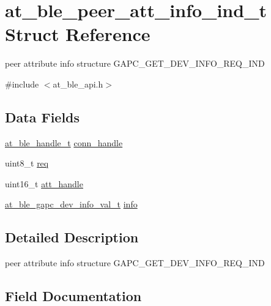 \hypertarget{structat__ble__peer__att__info__ind__t}{}\section{at\+\_\+ble\+\_\+peer\+\_\+att\+\_\+info\+\_\+ind\+\_\+t Struct Reference}
\label{structat__ble__peer__att__info__ind__t}


peer attribute info structure G\+A\+P\+C\+\_\+\+G\+E\+T\+\_\+\+D\+E\+V\+\_\+\+I\+N\+F\+O\+\_\+\+R\+E\+Q\+\_\+\+I\+ND  




{\ttfamily \#include $<$at\+\_\+ble\+\_\+api.\+h$>$}

\subsection*{Data Fields}
\begin{DoxyCompactItemize}
\item 
\mbox{\hyperlink{at__ble__api_8h_abd23646d0c662860741f787efc8456f2}{at\+\_\+ble\+\_\+handle\+\_\+t}} \mbox{\hyperlink{structat__ble__peer__att__info__ind__t_ae42df6fd8493f8f8faeccfdd6062e96f}{conn\+\_\+handle}}
\item 
uint8\+\_\+t \mbox{\hyperlink{structat__ble__peer__att__info__ind__t_aee31b0c3b9c08cd76406c7bd7cf74642}{req}}
\item 
uint16\+\_\+t \mbox{\hyperlink{structat__ble__peer__att__info__ind__t_a8cd0cff3a116d6ef67f787ae3a6a48d4}{att\+\_\+handle}}
\item 
\mbox{\hyperlink{unionat__ble__gapc__dev__info__val__t}{at\+\_\+ble\+\_\+gapc\+\_\+dev\+\_\+info\+\_\+val\+\_\+t}} \mbox{\hyperlink{structat__ble__peer__att__info__ind__t_ae74077355aa2f0a20c47a7d162d666cd}{info}}
\end{DoxyCompactItemize}


\subsection{Detailed Description}
peer attribute info structure G\+A\+P\+C\+\_\+\+G\+E\+T\+\_\+\+D\+E\+V\+\_\+\+I\+N\+F\+O\+\_\+\+R\+E\+Q\+\_\+\+I\+ND 

\subsection{Field Documentation}
\mbox{\label{structat__ble__peer__att__info__ind__t_a8cd0cff3a116d6ef67f787ae3a6a48d4}} 
